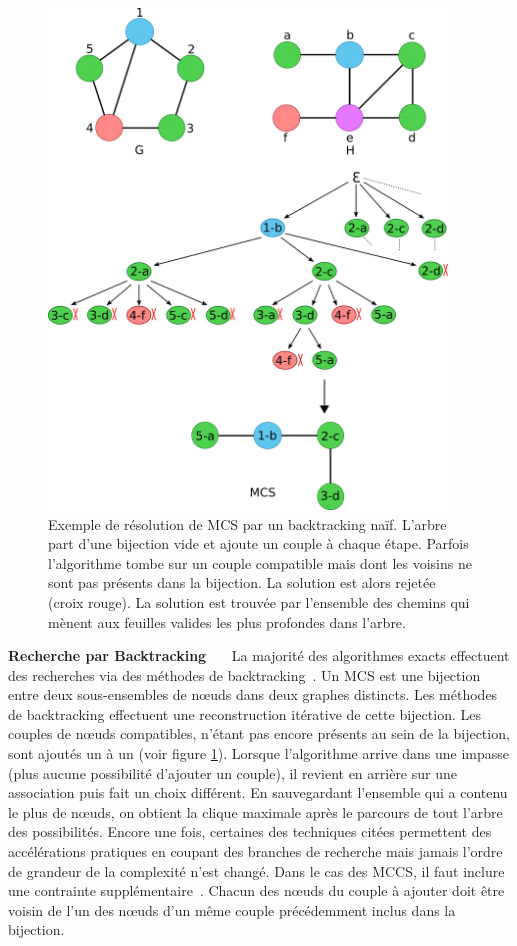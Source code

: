 \begin{figure}[!ht]
  \begin{center}
    \includegraphics[width=400px]{Figures/s2m/MCS-SI/backtracking_solve.png}
    \caption{\label{backtracking_solve}Exemple de résolution de MCS par un backtracking naïf.
    L'arbre part d'une bijection vide et ajoute un couple à chaque étape.
    Parfois l'algorithme tombe sur un couple compatible mais dont les voisins ne sont pas présents dans la bijection.
    La solution est alors rejetée (croix rouge).
    La solution est trouvée par l'ensemble des chemins qui mènent aux feuilles valides les plus profondes dans l'arbre.}
  \end{center}
\end{figure}


\textbf{Recherche par Backtracking}~~~
La majorité des algorithmes exacts effectuent des recherches via des méthodes de backtracking~\cite{manic_branch&cut_2009,mcgregor_backtrack_1982,kawabata_build-up_2011}.
Un MCS est une bijection entre deux sous-ensembles de n\oe{}uds dans deux graphes distincts.
Les méthodes de backtracking effectuent une reconstruction itérative de cette bijection.
Les couples de n\oe{}uds compatibles, n'étant pas encore présents au sein de la bijection, sont ajoutés un à un (voir figure \ref{backtracking_solve}).
Lorsque l'algorithme arrive dans une impasse (plus aucune possibilité d'ajouter un couple), il revient en arrière sur une association puis fait un choix différent.
En sauvegardant l'ensemble qui a contenu le plus de n\oe{}uds, on obtient la clique maximale après le parcours de tout l'arbre des possibilités.
Encore une fois, certaines des techniques citées permettent des accélérations pratiques en coupant des branches de recherche mais jamais l'ordre de grandeur de la complexité n'est changé.
Dans le cas des MCCS, il faut inclure une contrainte supplémentaire~\cite{chang_moderately_2014}.
Chacun des n\oe{}uds du couple à ajouter doit être voisin de l'un des n\oe{}uds d'un même couple précédemment inclus dans la bijection.

